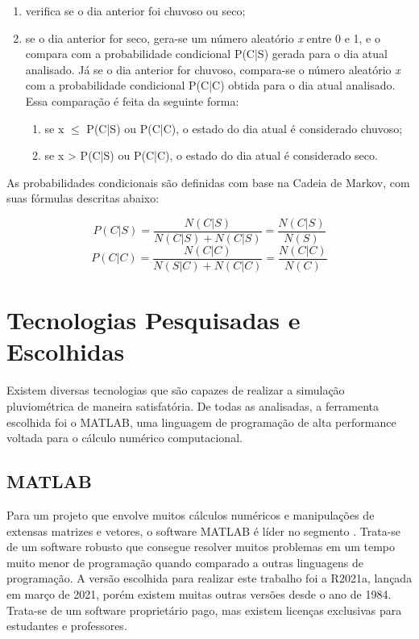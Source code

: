 \begin{enumerate}
  \item verifica se o dia anterior foi chuvoso ou seco;
  \item se o dia anterior for seco, gera-se um número aleatório \emph{x} entre 0 e 1, e o compara com a probabilidade condicional P(C|S) gerada para o dia atual analisado. Já se o dia anterior for chuvoso, compara-se o número aleatório \emph{x} com a probabilidade condicional P(C|C) obtida para o dia atual analisado. Essa comparação é feita da seguinte forma:
  \begin{enumerate}[label=(\alph*)]
   \item se x $\leq$ P(C|S) ou P(C|C), o estado do dia atual é considerado chuvoso; 
   \item se x > P(C|S) ou P(C|C), o estado do dia atual é considerado seco.
  \end{enumerate}
\end{enumerate}

As probabilidades condicionais são definidas com base na Cadeia de Markov, com suas fórmulas descritas abaixo:

\[
    P(C|S)=\frac{N(C|S)}{N(C|S)+N(C|S)}=\frac{N(C|S)}{N(S)}
\]
\[
    P(C|C)=\frac{N(C|C)}{N(S|C)+N(C|C)}=\frac{N(C|C)}{N(C)}
\]

\section{Tecnologias Pesquisadas e Escolhidas}
\label{s.tecnologias}

Existem diversas tecnologias que são capazes de realizar a simulação pluviométrica de maneira satisfatória. De todas as analisadas, a ferramenta escolhida foi o MATLAB, uma linguagem de programação de alta performance voltada para o cálculo numérico computacional.

\subsection{MATLAB}
\label{ss.matlab}

Para um projeto que envolve muitos cálculos numéricos e manipulações de extensas matrizes e vetores, o software MATLAB é líder no segmento \cite{matlab}. Trata-se de um software robusto que consegue resolver muitos problemas em um tempo muito menor de programação quando comparado a outras linguagens de programação.
A versão escolhida para realizar este trabalho foi a R2021a, lançada em março de 2021, porém existem muitas outras versões desde o ano de 1984. Trata-se de um software proprietário pago, mas existem licenças exclusivas para estudantes e professores.

